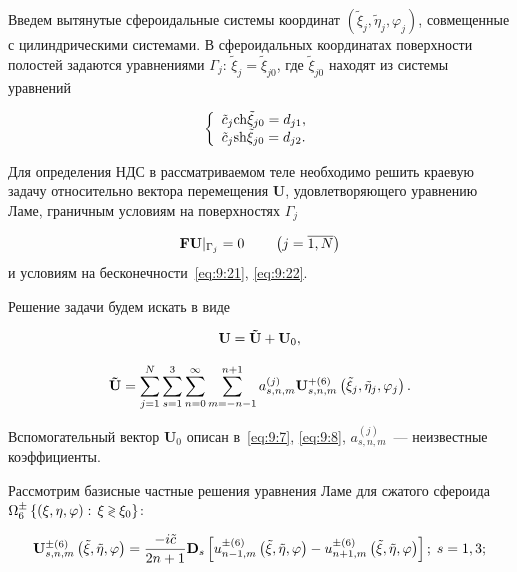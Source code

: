 Введем вытянутые сфероидальные системы координат $\left( {{{\tilde \xi }_j},{{\tilde \eta }_j},{\varphi _j}} \right)$, совмещенные с цилиндрическими системами. В сфероидальных координатах поверхности полостей задаются уравнениями ${\Gamma _j}:\,{\tilde \xi _j} = {\tilde \xi _{j0}}$, где $\tilde\xi_{j0}$ находят из системы уравнений

\begin{equation}
\left\{ {\begin{array}{*{20}{l}}
{{{\tilde c}_j}{\mathop{\rm ch}\nolimits} {{\tilde \xi }_{j0}} = {d_{j1}},}\\
{{{\tilde c}_j}{\mathop{\rm sh}\nolimits} {{\tilde \xi }_{j0}} = {d_{j2}}.}
\end{array}} \right.
\end{equation}

Для определения НДС в рассматриваемом теле необходимо решить краевую задачу относительно вектора перемещения $\mathbf{U}$, удовлетворяющего уравнению Ламе, граничным условиям на поверхностях $\Gamma_j$

\begin{equation}
{\bf{FU}}{|_{{\Gamma _j}}} = 0\qquad {\kern 1pt} \left( {j = \overline {1,N} } \right)
\label{eq:10:3}
\end{equation}
и условиям на бесконечности~\eqref{eq:9:21}, \eqref{eq:9:22}.

Решение задачи будем искать в виде

\begin{equation}
{\bf{U}} = {\bf{\tilde U}} + {{\bf{U}}_0},
\end{equation}

\begin{equation}
{\bf{\tilde U}} = \sum\limits_{j = 1}^N {\sum\limits_{s = 1}^3 {\sum\limits_{n = 0}^\infty  {\sum\limits_{m =  - n - 1}^{n + 1} {a_{s,n,m}^{(j)}} } } } {\bf{U}}_{s,n,m}^{ + (6)}\left( {{{\tilde \xi }_j},{{\tilde \eta }_j},{\varphi _j}} \right).
\end{equation}

Вспомогательный вектор $\mathbf{U}_0$ описан в~\eqref{eq:9:7}, \eqref{eq:9:8}, $a_{s,n,m}^{(j)}$~--- неизвестные коэффициенты.

Рассмотрим базисные частные решения уравнения Ламе для сжатого сфероида $\Omega _6^ \pm \left\{ {(\xi ,\eta ,\varphi ):{\mkern 1mu} {\kern 1pt} \xi  \mathbin{\lower.3ex\hbox{$\buildrel>\over
{\smash{\scriptstyle<}\vphantom{_x}}$}} {\xi _0}} \right\}$:

\begin{equation}
{\bf{U}}_{s,n,m}^{ \pm (6)}\left( {\tilde \xi ,\tilde \eta ,\varphi } \right) = \frac{{ - i\tilde c}}{{2n + 1}}{{\bf{D}}_s}\left[ {u_{n - 1,m}^{ \pm (6)}\left( {\tilde \xi ,\tilde \eta ,\varphi } \right) - u_{n + 1,m}^{ \pm (6)}\left( {\tilde \xi ,\tilde \eta ,\varphi } \right)} \right];\,{\kern 1pt} s = 1,3;
\label{eq:10:1}
\end{equation}

